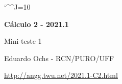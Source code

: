 \documentclass[oneside,12pt]{article}
\begin{document}
\catcode`\^^J=10

\pu

%
%

\def\mname#1{\text{[#1]}}

\def\drafturl{http://angg.twu.net/LATEX/2021-1-C2.pdf}
\def\drafturl{http://angg.twu.net/2021.1-C2.html}
\def\draftfooter{\tiny \href{\drafturl}{\jobname{}} \ColorBrown{\shorttoday{} \hours}}



%

\thispagestyle{empty}

\begin{center}

\vspace*{1.2cm}

{\bf \Large Cálculo 2 - 2021.1}

\bsk

Mini-teste 1

\bsk

Eduardo Ochs - RCN/PURO/UFF

\url{http://angg.twu.net/2021.1-C2.html}

\end{center}
\end{document}
